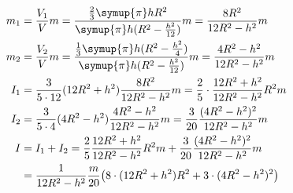 \begin{align}
    m_1&=\frac{V_1}{V}m=\frac{\frac{2}{3}\symup{\pi}hR^2}{\symup{\pi}h(R^2-\frac{h^2}{12})}m=\frac{8R^2}{12R^2-h^2}m \\
    m_2&=\frac{V_2}{V}m=\frac{\frac{1}{3}\symup{\pi}h(R^2-\frac{h^2}{4})}{\symup{\pi}h(R^2-\frac{h^2}{12})}m=\frac{4R^2-h^2}{12R^2-h^2}m \\
    I_1&=\frac{3}{5\cdot12}(12R^2+h^2)\frac{8R^2}{12R^2-h^2}m=\frac{2}{5}\cdot \frac{12R^2+h^2}{12R^2-h^2}R^2m \\
    I_2&=\frac{3}{5\cdot4}(4R^2-h^2)\frac{4R^2-h^2}{12R^2-h^2}m=\frac{3}{20}\frac{(4R^2-h^2)^2}{12R^2-h^2}m \\
    I&=I_1+I_2=\frac{2}{5}\frac{12R^2+h^2}{12R^2-h^2}R^2m+\frac{3}{20}\frac{(4R^2-h^2)^2}{12R^2-h^2}m \\
        &= \frac{1}{12R^2-h^2}\frac{m}{20}\bigl(8\cdot(12R^2+h^2)R^2+3\cdot(4R^2-h^2)^2\bigr) 
\end{align}